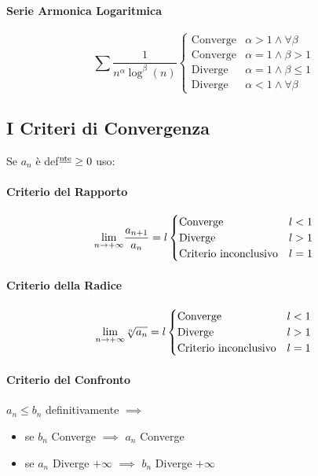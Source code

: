 \documentclass[12pt, a4paper]{article}
\begin{document}
	\paragraph*{Serie Armonica Logaritmica}
	\begin{equation*}
		\sum \frac{1}{n^\alpha \log^\beta(n)}
		\begin{cases}
			\text{Converge} & \alpha > 1 \wedge \forall \beta \\
			\text{Converge} & \alpha = 1 \wedge \beta > 1     \\
			\text{Diverge}  & \alpha = 1 \wedge \beta \leq 1  \\
			\text{Diverge}  & \alpha < 1 \wedge \forall \beta
		\end{cases}
	\end{equation*}


	\subsection*{I Criteri di Convergenza}
	Se $a_n$ è def$^{\text{\underline{nte}}} \geq 0$ uso:  

	\paragraph*{Criterio del Rapporto} 
	\[
		\underset{n \to +\infty}{\lim} \frac{a_{n+1}}{a_n} = l
		\begin{cases}
			\text{Converge} &  l<1\\
			\text{Diverge} & l>1\\
			\text{Criterio inconclusivo} & l=1
		\end{cases}
	\]

	\paragraph*{Criterio della Radice} 
	\[
		\underset{n \to +\infty}{\lim} \sqrt[n]{a_n} = l
		\begin{cases}
			\text{Converge} &  l<1\\
			\text{Diverge} & l>1\\
			\text{Criterio inconclusivo} & l=1
		\end{cases}
	\]

	\paragraph*{Criterio del Confronto}
	$a_n\leq b_n$ definitivamente $\implies$
	\begin{itemize}
		\item se $b_n$ Converge $\implies$  $a_n$ Converge
		\item se $a_n$ Diverge $+\infty$ $\implies$ $b_n$ Diverge $+\infty$
	\end{itemize}
\end{document}
